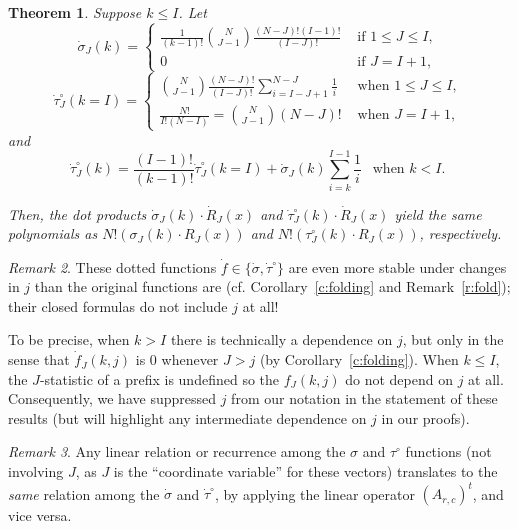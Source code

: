 \documentclass[11pt]{amsart}   %
\newtheorem{theorem}{Theorem}[section]
\theoremstyle{definition}
\theoremstyle{remark}
\newtheorem{remark}[theorem]{Remark}
\numberwithin{equation}{section}
\theoremstyle{theorem}
\begin{document}
\begin{theorem}\label{t:rebasis_e}
    Suppose $k \leq I$.  Let 
    \[ \dot\sigma_J(k) = \begin{cases} \frac{1}{(k-1)!} {N \choose {J-1}} \frac{(N-J)!(I-1)!}{(I-J)!} & \text{ if $1 \leq J \leq I$, } \\ 0 & \text{ if $J = I+1$, } \end{cases} \]
    \[ \dot\tau^\circ_J(k = I) = \begin{cases} {N \choose {J-1}} \frac{(N-J)!}{(I-J)!} \sum_{i=I-J+1}^{N-J} \frac{1}{i} & \text{ when $1 \leq J \leq I$, } \\ \frac{N!}{I! (N-I)} = {N \choose {J-1}}(N-J)! & \text{ when $J = I+1$, }  \end{cases} \]
    and 
    \[ \dot\tau^\circ_J(k) = \frac{(I-1)!}{(k-1)!} \dot\tau^\circ_J(k=I) + \dot\sigma_J(k) \sum_{i=k}^{I-1} \frac{1}{i} \ \ \text{ when $k < I$. } \]

    Then, the dot products $\dot\sigma_J(k) \cdot \dot{R}_J(x)$ and $\dot\tau^\circ_J(k) \cdot \dot{R}_J(x)$ yield the same polynomials as $N! (\sigma_J(k) \cdot R_J(x))$ and $N! (\tau^\circ_J(k) \cdot R_J(x))$, respectively.
\end{theorem}

\begin{remark}\label{r:dotfold}
These dotted functions $\dot{f} \in \{\dot\sigma, \dot\tau^\circ\}$ are even
more stable under changes in $j$ than the original functions are (cf.
Corollary~\ref{c:folding} and Remark~\ref{r:fold}); their closed formulas do
not include $j$ at all! 

To be precise, when $k > I$ there is technically a dependence on $j$, but only
in the sense that $\dot{f}_J(k,j)$ is $0$ whenever $J > j$ (by
Corollary~\ref{c:folding}).  When $k \leq I$, the $J$-statistic of a prefix is
undefined so the $f_J(k,j)$ do not depend on $j$ at all.  Consequently, we have
suppressed $j$ from our notation in the statement of these results (but will
highlight any intermediate dependence on $j$ in our proofs).
\end{remark}

\begin{remark}\label{r:uddtrans}
Any linear relation or recurrence among the $\sigma$ and $\tau^\circ$ functions (not involving $J$, as $J$ is the ``coordinate variable'' for these vectors) translates to the {\em same} relation among the $\dot\sigma$ and $\dot\tau^\circ$, by applying the linear operator $\left(A_{r,c}\right)^t$, and vice versa.
\end{remark}
\end{document}
